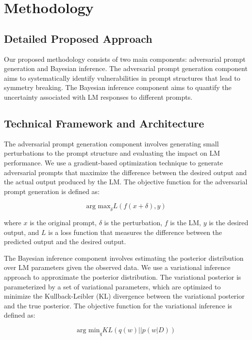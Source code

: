 \documentclass{article}
\begin{document}
\section{Methodology}

\subsection{Detailed Proposed Approach}
Our proposed methodology consists of two main components: adversarial prompt generation and Bayesian inference. The adversarial prompt generation component aims to systematically identify vulnerabilities in prompt structures that lead to symmetry breaking. The Bayesian inference component aims to quantify the uncertainty associated with LM responses to different prompts.

\subsection{Technical Framework and Architecture}
The adversarial prompt generation component involves generating small perturbations to the prompt structure and evaluating the impact on LM performance. We use a gradient-based optimization technique to generate adversarial prompts that maximize the difference between the desired output and the actual output produced by the LM. The objective function for the adversarial prompt generation is defined as:

\begin{equation}
    \text{arg max}_{\delta} L(f(x + \delta), y)
\end{equation}

where $x$ is the original prompt, $\delta$ is the perturbation, $f$ is the LM, $y$ is the desired output, and $L$ is a loss function that measures the difference between the predicted output and the desired output.

The Bayesian inference component involves estimating the posterior distribution over LM parameters given the observed data. We use a variational inference approach to approximate the posterior distribution. The variational posterior is parameterized by a set of variational parameters, which are optimized to minimize the Kullback-Leibler (KL) divergence between the variational posterior and the true posterior. The objective function for the variational inference is defined as:

\begin{equation}
    \text{arg min}_{q} KL(q(w) || p(w|D))
\end{equation}
\end{document}
